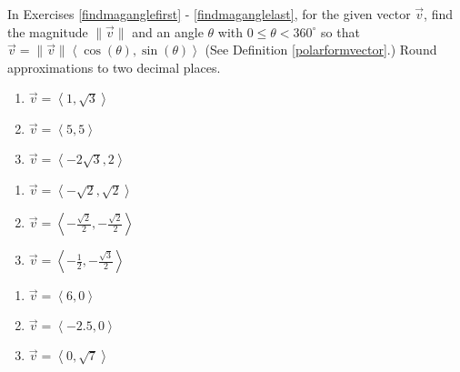\documentclass{ximera}
\begin{document}
In Exercises \ref{findmaganglefirst} - \ref{findmaganglelast}, for the given vector $\vec{v}$, find the magnitude $\|\vec{v}\|$ and an angle $\theta$ with $0 \leq \theta < 360^{\circ}$ so that $\vec{v} = \|\vec{v}\| \left<\cos(\theta), \sin(\theta) \right>$ (See Definition \ref{polarformvector}.)  Round approximations to two decimal places.

\begin{multicols}{3}

\begin{enumerate}

\setcounter{enumi}{\value{HW}}

\item  $\vec{v} = \left<1,\sqrt{3}\right>$ \label{findmaganglefirst} 
\item $\vec{v} = \left<5,5\right>$
\item $\vec{v} = \left<-2\sqrt{3}, 2 \right>$

\setcounter{HW}{\value{enumi}}

\end{enumerate}

\end{multicols}

\begin{multicols}{3}

\begin{enumerate}

\setcounter{enumi}{\value{HW}}

\item $\vec{v} = \left<-\sqrt{2}, \sqrt{2} \right>$
\item $\vec{v} = \left<-\frac{\sqrt{2}}{2}, -\frac{\sqrt{2}}{2}\right>$
\item $\vec{v} = \left<-\frac{1}{2}, -\frac{\sqrt{3}}{2}  \right>$

\setcounter{HW}{\value{enumi}}

\end{enumerate}

\end{multicols}

\begin{multicols}{3}

\begin{enumerate}

\setcounter{enumi}{\value{HW}}

\item $\vec{v} = \left<6, 0\right>$
\item $\vec{v} = \left<-2.5, 0\right>$
\item $\vec{v} = \left<0, \sqrt{7} \right>$

\setcounter{HW}{\value{enumi}}

\end{enumerate}

\end{multicols}
\end{document}
